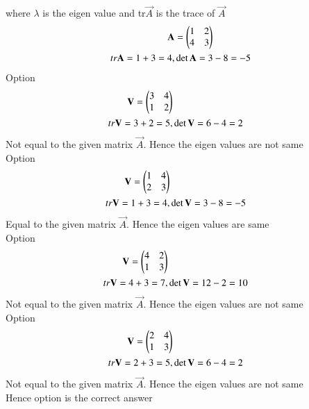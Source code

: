 \documentclass[journal]{IEEEtran}
\begin{document}
where $\lambda$ is the eigen value and tr$\vec{A}$ is the trace of $\vec{A}$
\begin{align}
    \mathbf{A}&=\begin{pmatrix}1&2\\4&3\end{pmatrix}\\
    tr\mathbf{A}=1+3=4,&\det{\mathbf{A}}=3-8=-5
\end{align}
Option 
\begin{align}
  \mathbf{V}=\begin{pmatrix}3&4\\1&2\end{pmatrix}\\
  tr\mathbf{V}=3+2=5,&\det{\mathbf{V}}=6-4=2
\end{align}
Not equal to the given matrix $\vec{A}$. Hence the eigen values are not same \\
Option 
\begin{align}
  \mathbf{V}=\begin{pmatrix}1&4\\2&3\end{pmatrix}\\
  tr\mathbf{V}=1+3=4,&\det{\mathbf{V}}=3-8=-5
\end{align}
Equal to the given matrix $\vec{A}$. Hence the eigen values are  same \\
Option 
\begin{align}
  \mathbf{V}=\begin{pmatrix}4&2\\1&3\end{pmatrix}\\
  tr\mathbf{V}=4+3=7,&\det{\mathbf{V}}=12-2=10
\end{align}
Not equal to the given matrix $\vec{A}$. Hence the eigen values are not same \\
Option 
\begin{align}
  \mathbf{V}=\begin{pmatrix}2&4\\1&3\end{pmatrix}\\
  tr\mathbf{V}=2+3=5,&\det{\mathbf{V}}=6-4=2
\end{align}
Not equal to the given matrix $\vec{A}$. Hence the eigen values are not same \\

Hence option  is the correct answer
\end{document}

